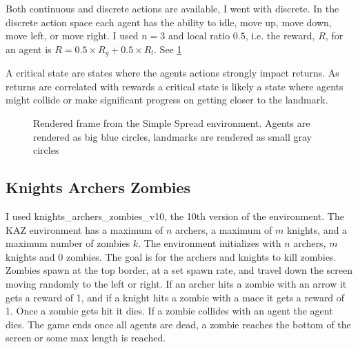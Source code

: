 \documentclass[UKenglish]{uiomasterthesis}
\begin{document}
Both continuous and discrete actions are available, I went with discrete. In the discrete action space each agent has the ability to idle, move up, move down, move left, or move right. I used $n=3$ and local ratio $0.5$, i.e. the reward, $R$, for an agent is $R = 0.5\times R_g + 0.5\times R_l$. See \cref{fig:simple_spread_env}

A critical state are states where the agents actions strongly impact returns. As returns are correlated with rewards a critical state is likely a state where agents might collide or make significant progress on getting closer to the landmark.

\begin{figure}[hbtp]
    \centering
    \caption{Rendered frame from the Simple Spread environment. Agents are rendered as big blue circles, landmarks are rendered as small gray circles}
    \label{fig:simple_spread_env}
\end{figure}

\subsection{Knights Archers Zombies}
\label{sec:kaz_env}
I used knights\_archers\_zombies\_v10, the 10th version of the environment. The KAZ environment has a maximum of $n$ archers, a maximum of $m$ knights, and a maximum number of zombies $k$. The environment initializes with $n$ archers, $m$ knights and 0 zombies. The goal is for the archers and knights to kill zombies. Zombies spawn at the top border, at a set spawn rate, and travel down the screen moving randomly to the left or right. If an archer hits a zombie with an arrow it gets a reward of 1, and if a knight hits a zombie with a mace it gets a reward of 1. Once a zombie gets hit it dies. If a zombie collides with an agent the agent dies. The game ends once all agents are dead, a zombie reaches the bottom of the screen or some max length is reached.
\end{document}
